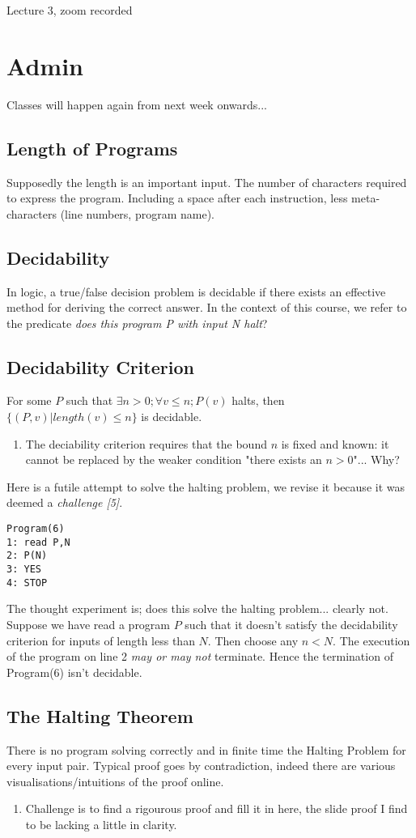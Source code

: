 \documentclass{article}
\begin{document}
Lecture 3, zoom recorded

\section*{Admin}
Classes will happen again from next week onwards...

\subsection*{Length of Programs}
Supposedly the length is an important input. The number of characters required to express the program. Including a space after each instruction, less meta-characters (line numbers, program name).

\subsection*{Decidability}
In logic, a true/false decision problem is decidable if there exists an effective method for deriving the correct answer. In the context of this course, we refer to the predicate \emph{does this program P with input N halt}?

\subsection*{Decidability Criterion}
For some $P$ such that $\exists n > 0; \forall v \leq n; P(v)$ halts, then $\{ (P, v) | length(v) \leq n\}$ is decidable.

\begin{enumerate}
	\item The deciability criterion requires that the bound $n$ is fixed and known: it cannot be replaced by the weaker condition "there exists an $n > 0$"... Why?
\end{enumerate}

Here is a futile attempt to solve the halting problem, we revise it because it was deemed a \emph{challenge [5]}.
\begin{verbatim}
Program(6)
1: read P,N
2: P(N)
3: YES
4: STOP
\end{verbatim}
The thought experiment is; does this solve the halting problem... clearly not. Suppose we have read a program $P$ such that it doesn't satisfy the decidability criterion for inputs of length less than $N$. Then choose any $n < N$. The execution of the program on line 2 \emph{may or may not} terminate. Hence the termination of Program(6) isn't decidable.

\subsection*{The Halting Theorem}
There is no program solving correctly and in finite time the Halting Problem for every input pair. Typical proof goes by contradiction, indeed there are various visualisations/intuitions of the proof online.

\begin{enumerate}
	\item Challenge is to find a rigourous proof and fill it in here, the slide proof I find to be lacking a little in clarity.
\end{enumerate}
\end{document}
